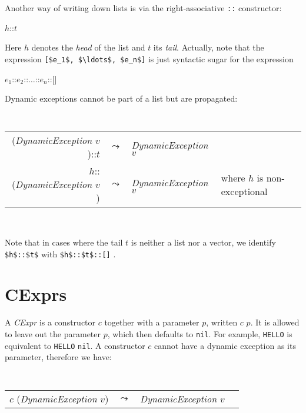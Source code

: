 \documentclass[11pt]{amsart}
\newcommand{\metababel}[1] {\textsl{#1}}
\newenvironment{babelcode}[0]{\begin{center}\tt}{\end{center}}
\newcommand{\babelsrc}[1] {\lstinline!#1!}
\begin{document}
Another way of writing down lists is via the right-associative \babelsrc{::} constructor:
\begin{babellisting}
$h$::$t$
\end{babellisting}
Here $h$ denotes the \emph{head} of the list and $t$ its \emph{tail}. Actually, note that the expression \babelsrc{[$e_1$, $\ldots$, $e_n$]} is just syntactic sugar for the expression
\begin{babellisting}
$e_1$::$e_2$::$\ldots$::$e_n$::[]
\end{babellisting}
Dynamic exceptions cannot be part of a list but are propagated:
\begin{babelcode}
\begin{tabular}{rcll}
(\metababel{DynamicException $v$})::$t$ & $\leadsto$ & \metababel{DynamicException $v$}&\\
$h$::(\metababel{DynamicException $v$}) & $\leadsto$ & \metababel{DynamicException $v$}& {\rm where $h$ is non-exceptional}\\
\end{tabular}\\
\end{babelcode}
Note that in cases where the tail $t$ is neither a list nor a vector, we identify \babelsrc{$h$::$t$} with  \babelsrc{$h$::$t$::[]} . 

\section{CExprs}
A \metababel{CExpr} is a constructor $c$ together with a parameter $p$, written $c$ $p$. It is allowed to leave out the parameter $p$, which then defaults to \babelsrc{nil}. For example,  \babelsrc{HELLO} is equivalent to \babelsrc{HELLO} \babelsrc{nil}. A constructor $c$ cannot have a dynamic exception as its parameter, therefore we have:
\begin{babelcode}
\begin{tabular}{rcll}
$c$ (\metababel{DynamicException $v$}) & $\leadsto$ & \metababel{DynamicException $v$}&\\
\end{tabular}\\
\end{babelcode}
\end{document}
